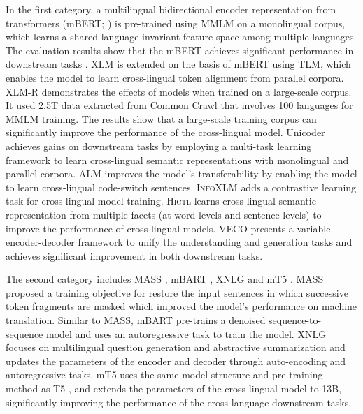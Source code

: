 \documentclass[11pt]{article}
\begin{document}
In the first category, a multilingual bidirectional encoder representation from transformers (mBERT; \citealt{devlin2018bert}) is pre-trained using MMLM on a monolingual corpus, which learns a shared language-invariant feature space among multiple languages. The evaluation results show that the mBERT achieves significant performance in downstream tasks \cite{wu2019beto}. XLM \cite{lample2019cross} is extended on the basis of mBERT using TLM, which enables the model to learn cross-lingual token alignment from parallel corpora. XLM-R \cite{conneau2019unsupervised} demonstrates the effects of models when trained on a large-scale corpus. It used 2.5T data extracted from Common Crawl \cite{wenzek2019ccnet} that involves 100 languages for MMLM training. The results show that a large-scale training corpus can significantly improve the performance of the cross-lingual model. Unicoder \cite{huang2019unicoder} achieves gains on downstream tasks by employing a multi-task learning framework to learn cross-lingual semantic representations with monolingual and parallel corpora. ALM \cite{yang2020alternating} improves the model's transferability by enabling the model to learn cross-lingual code-switch sentences. \textsc{InfoXLM} \cite{chi2020infoxlm} adds a contrastive learning task for cross-lingual model training. \textsc{Hictl} \cite{wei2020learning} learns cross-lingual semantic representation from multiple facets (at word-levels and sentence-levels) to improve the performance of cross-lingual models. VECO \cite{luo2020veco} presents a variable encoder-decoder framework to unify the understanding and generation tasks and achieves significant improvement in both downstream tasks.

The second category includes MASS \cite{song2019mass}, mBART \cite{liu2020multilingual}, XNLG \cite{chi2020cross} and mT5 \cite{xue2020mt5}. MASS \cite{vaswani2017attention} proposed a training objective for restore the input sentences in which successive token fragments are masked which improved the model's performance on machine translation. Similar to MASS, mBART pre-trains a denoised sequence-to-sequence model and uses an autoregressive task to train the model. XNLG focuses on multilingual question generation and abstractive summarization and updates the parameters of the encoder and decoder through auto-encoding and autoregressive tasks. mT5 uses the same model structure and pre-training method as T5 \cite{raffel2019exploring}, and extends the parameters of the cross-lingual model to 13B, significantly improving the performance of the cross-language downstream tasks.
\end{document}
